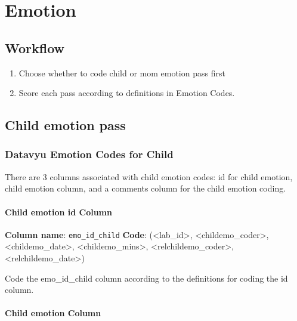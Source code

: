\documentclass[
]{book}
\providecommand{\tightlist}{%
  \setlength{\itemsep}{0pt}\setlength{\parskip}{0pt}}
\begin{document}
\hypertarget{emotion}{%
\chapter{Emotion}\label{emotion}}

\hypertarget{workflow-2}{%
\section{Workflow}\label{workflow-2}}

\begin{enumerate}
\def\labelenumi{\arabic{enumi}.}
\tightlist
\item
  Choose whether to code child or mom emotion pass first
\item
  Score each pass according to definitions in Emotion Codes.
\end{enumerate}

\hypertarget{child-emotion-pass}{%
\section{Child emotion pass}\label{child-emotion-pass}}

\hypertarget{datavyu-emotion-codes-for-child}{%
\subsection{Datavyu Emotion Codes for Child}\label{datavyu-emotion-codes-for-child}}

There are 3 columns associated with child emotion codes: id for child emotion, child emotion column, and a comments column for the child emotion coding.

\hypertarget{child-emotion-id-column}{%
\subsubsection*{Child emotion id Column}\label{child-emotion-id-column}}

\textbf{Column name}: \texttt{emo\_id\_child}
\textbf{Code}: (\textless lab\_id\textgreater, \textless childemo\_coder\textgreater, \textless childemo\_date\textgreater, \textless childemo\_mins\textgreater, \textless relchildemo\_coder\textgreater, \textless relchildemo\_date\textgreater)

Code the emo\_id\_child column according to the definitions for coding the id column.

\hypertarget{child-emotion-column}{%
\subsubsection*{Child emotion Column}\label{child-emotion-column}}
\end{document}
